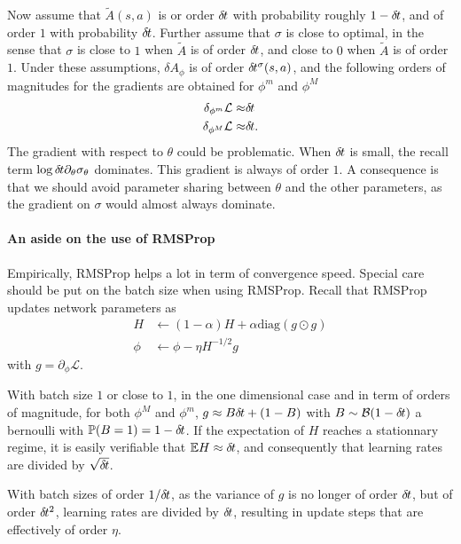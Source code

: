 \documentclass[11pt]{article}
\newcommand{\deltat}{\delta \hspace{-.1em}t}
\begin{document}
Now assume that $\tilde{A}(s, a)$ is or order $\deltat$ with probability roughly $1 - \deltat$, and
of order $1$ with probability $\deltat$. Further assume that $\sigma$ is close to optimal, in the sense
that $\sigma$ is close to $1$ when $\tilde{A}$ is of order $\deltat$, and close to $0$ when $\tilde{A}$
is of order $1$. Under these assumptions, $\delta A_\phi$ is of order $\deltat^\sigma(s, a)$, and the
following orders of magnitudes for the gradients are obtained for $\phi^m$ and $\phi^M$
\begin{align}
	\delta_{\phi^m} \mathcal{L} \approx& \deltat\\
	\delta_{\phi^M} \mathcal{L} \approx& \deltat.
\end{align}
The gradient with respect to $\theta$ could be problematic. When $\deltat$ is small, the recall term
$\log{\deltat} \partial_\theta \sigma_\theta$ dominates. This gradient is always of order $1$. A
consequence is that we should avoid parameter sharing between $\theta$ and the other parameters, as
the gradient on $\sigma$ would almost always dominate.

\paragraph{An aside on the use of RMSProp}
Empirically, RMSProp helps a lot in term of convergence speed. Special care should be put on the batch
size when using RMSProp. Recall that RMSProp updates network parameters as
\begin{align}
	H &\leftarrow (1 - \alpha) H + \alpha \text{diag}(g \odot g)\\
	\phi &\leftarrow \phi - \eta H^{-1/2} g
\end{align}
with $g = \partial_\phi \mathcal{L}$.

With batch size $1$ or close to $1$, in
the one dimensional case and in term of orders of magnitude, for both $\phi^M$
and $\phi^m$, $g \approx B \deltat + (1 - B)$ with $B\sim \mathcal{B}(1 -
\deltat)$ a bernoulli with $\mathbb{P}(B = 1) = 1 - \deltat$. If the
expectation of $H$ reaches a stationnary regime, it is easily verifiable that
$\mathbb{E} H \approx \deltat$, and consequently that learning rates are divided
by $\sqrt{\deltat}$.

With batch sizes of order $1 / \deltat$, as the variance of $g$ is no longer of order
$\deltat$, but of order $\deltat^2$, learning rates are divided
by $\deltat$, resulting in update steps that are effectively of order $\eta$.
\end{document}
